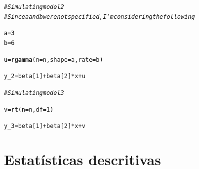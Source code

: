\documentclass{homework}\usepackage[]{graphicx}\usepackage[]{color}
\makeatletter
\newcommand{\hlnum}[1]{\textcolor[rgb]{0.686,0.059,0.569}{#1}}%
\newcommand{\hlcom}[1]{\textcolor[rgb]{0.678,0.584,0.686}{\textit{#1}}}%
\newcommand{\hlopt}[1]{\textcolor[rgb]{0,0,0}{#1}}%
\newcommand{\hlstd}[1]{\textcolor[rgb]{0.345,0.345,0.345}{#1}}%
\newcommand{\hlkwb}[1]{\textcolor[rgb]{0.69,0.353,0.396}{#1}}%
\newcommand{\hlkwc}[1]{\textcolor[rgb]{0.333,0.667,0.333}{#1}}%
\newcommand{\hlkwd}[1]{\textcolor[rgb]{0.737,0.353,0.396}{\textbf{#1}}}%
\newenvironment{kframe}{%
 \def\at@end@of@kframe{}%
 \ifinner\ifhmode%
  \def\at@end@of@kframe{\end{minipage}}%
  \begin{minipage}{\columnwidth}%
 \fi\fi%
 \def\FrameCommand##1{\hskip\@totalleftmargin \hskip-\fboxsep
 \colorbox{shadecolor}{##1}\hskip-\fboxsep
     \hskip-\linewidth \hskip-\@totalleftmargin \hskip\columnwidth}%
 \MakeFramed {\advance\hsize-\width
   \@totalleftmargin\z@ \linewidth\hsize
   \@setminipage}}%
 {\par\unskip\endMakeFramed%
 \at@end@of@kframe}
\newenvironment{knitrout}{}{} %
\makeatother
\begin{document}
\begin{knitrout}
\color{fgcolor}\begin{kframe}
\begin{alltt}
\hlcom{# Simulating model 2}
\hlcom{# Since a and b were not specified, I'm considering the following}

\hlstd{a} \hlkwb{=} \hlnum{3}
\hlstd{b} \hlkwb{=} \hlnum{6}

\hlstd{u} \hlkwb{=} \hlkwd{rgamma}\hlstd{(}\hlkwc{n} \hlstd{= n,} \hlkwc{shape} \hlstd{= a,} \hlkwc{rate} \hlstd{= b)}

\hlstd{y_2} \hlkwb{=} \hlstd{beta[}\hlnum{1}\hlstd{]} \hlopt{+} \hlstd{beta[}\hlnum{2}\hlstd{]} \hlopt{*} \hlstd{x} \hlopt{+} \hlstd{u}
\end{alltt}
\end{kframe}
\end{knitrout}

\begin{knitrout}
\color{fgcolor}\begin{kframe}
\begin{alltt}
\hlcom{# Simulating model 3}

\hlstd{v} \hlkwb{=} \hlkwd{rt}\hlstd{(}\hlkwc{n} \hlstd{= n,} \hlkwc{df} \hlstd{=} \hlnum{1}\hlstd{)}

\hlstd{y_3} \hlkwb{=} \hlstd{beta[}\hlnum{1}\hlstd{]} \hlopt{+} \hlstd{beta[}\hlnum{2}\hlstd{]} \hlopt{*} \hlstd{x} \hlopt{+} \hlstd{v}
\end{alltt}
\end{kframe}
\end{knitrout}

\section{Estatísticas descritivas}
\end{document}
